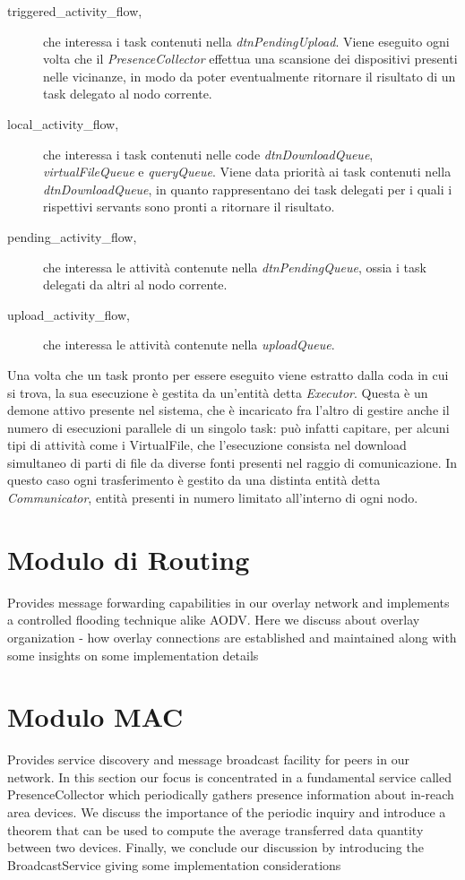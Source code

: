 \begin{description}
\item[triggered\_activity\_flow,] che interessa i task contenuti nella \textit{dtnPendingUpload}. Viene eseguito ogni volta che il \textit{PresenceCollector} effettua una scansione dei dispositivi presenti nelle vicinanze, in modo da poter eventualmente ritornare il risultato di un task delegato al nodo corrente.
\item[local\_activity\_flow,] che interessa i task contenuti nelle code \textit{dtnDownloadQueue}, \textit{virtualFileQueue} e \textit{queryQueue}. Viene data priorità ai task contenuti nella \textit{dtnDownloadQueue}, in quanto rappresentano dei task delegati per i quali i rispettivi servants sono pronti a ritornare il risultato.
\item[pending\_activity\_flow,] che interessa le attività contenute nella \textit{dtnPendingQueue}, ossia i task delegati da altri al nodo corrente. 
\item[upload\_activity\_flow,] che interessa le attività contenute nella \textit{uploadQueue}.
\end{description}

Una volta che un task pronto per essere eseguito viene estratto dalla coda in cui si trova, la sua esecuzione è gestita da un'entità detta \textit{Executor}. Questa è un demone attivo presente nel sistema, che è incaricato fra l'altro di gestire anche il numero di esecuzioni parallele di un singolo task: può infatti capitare, per alcuni tipi di attività come i VirtualFile, che l'esecuzione consista nel download simultaneo di parti di file da diverse fonti presenti nel raggio di comunicazione. In questo caso ogni trasferimento è gestito da una distinta entità detta \textit{Communicator}, entità presenti in numero limitato all'interno di ogni nodo.


\section{Modulo di Routing}
Provides message forwarding capabilities in our overlay network and implements a controlled flooding technique alike AODV. Here we discuss about overlay organization - how overlay connections are established and maintained along with some insights on some implementation details

\section{Modulo MAC}
Provides service discovery and message broadcast facility for peers in our network. In this section our focus is concentrated in a fundamental service called PresenceCollector which periodically gathers presence information about in-reach area devices. We discuss the importance of the periodic inquiry and introduce a theorem that can be used to compute the average transferred data quantity between two devices. Finally, we conclude our discussion by introducing the BroadcastService giving some implementation considerations

